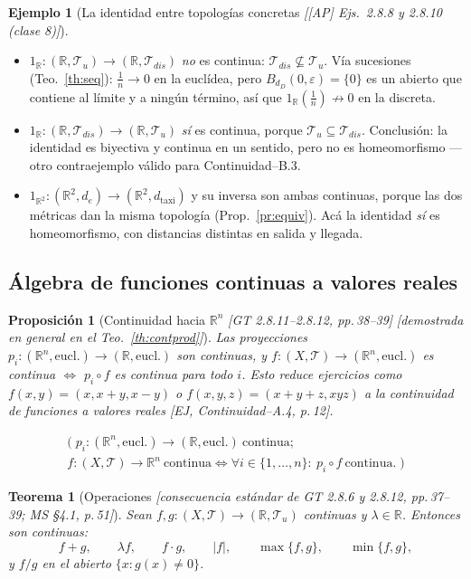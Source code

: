 \documentclass[11pt,a4paper]{article}
\newcommand{\lgc}[1]{\par\vspace{-3pt}\begin{gather*}\big(\;#1\;\big)\end{gather*}\vspace{-6pt}}
\theoremstyle{definition}
\newtheorem{ejemplo}[definicion]{Ejemplo}
\theoremstyle{plain}
\newtheorem{teorema}[definicion]{Teorema}
\newtheorem{proposicion}[definicion]{Proposición}
\newcommand{\fnt}[1]{{\normalfont\small\itshape\color{gray!150!black}[#1]}}
\newcommand{\R}{\mathbb{R}}
\newcommand{\tp}{\mathcal{T}}
\begin{document}
\begin{ejemplo}[La identidad entre topologías concretas \fnt{[AP] Ejs.\ 2.8.8 y 2.8.10 (clase 8)}]\label{ej:iddisc}
\begin{itemize}[leftmargin=1.4em,itemsep=1pt]
\item $1_\R:(\R,\tp_u)\to(\R,\tp_{dis})$ \emph{no} es continua: $\tp_{dis}\not\subseteq\tp_u$. Vía sucesiones (Teo.~\ref{th:seq}): $\tfrac1n\to0$ en la euclídea, pero $B_{d_D}(0,\varepsilon)=\{0\}$ es un abierto que contiene al límite y a ningún término, así que $1_\R(\tfrac1n)\not\to 0$ en la discreta.
\item $1_\R:(\R,\tp_{dis})\to(\R,\tp_u)$ \emph{sí} es continua, porque $\tp_u\subseteq\tp_{dis}$. Conclusión: la identidad es biyectiva y continua en un sentido, pero no es homeomorfismo --- otro contraejemplo válido para Continuidad--B.3.
\item $1_{\R^2}:(\R^2,d_e)\to(\R^2,d_{\text{taxi}})$ y su inversa son ambas continuas, porque las dos métricas dan la misma topología (Prop.~\ref{pr:equiv}). Acá la identidad \emph{sí} es homeomorfismo, con distancias distintas en salida y llegada.
\end{itemize}
\end{ejemplo}

\subsection{Álgebra de funciones continuas a valores reales}\label{sec:alg}

\begin{proposicion}[Continuidad hacia $\R^n$ \fnt{GT 2.8.11--2.8.12, pp.\,38--39} \fnt{demostrada en general en el Teo.~\ref{th:contprod}}]\label{pr:coord}
Las proyecciones $p_i:(\R^n,\text{eucl.})\to(\R,\text{eucl.})$ son continuas, y $f:(X,\tp)\to(\R^n,\text{eucl.})$ es continua $\iff$ $p_i\circ f$ es continua para todo $i$. Esto reduce ejercicios como $f(x,y)=(x,x+y,x-y)$ o $f(x,y,z)=(x+y+z,xyz)$ a la continuidad de funciones a valores reales \fnt{EJ, Continuidad--A.4, p.\,12}.
\lgc{p_i:(\R^n,\text{eucl.})\to(\R,\text{eucl.})\ \text{continua};\\
f:(X,\tp)\to\R^n\ \text{continua}\iff \forall i\in\{1,\dots,n\}:\ p_i\circ f\ \text{continua}.}
\end{proposicion}

\begin{teorema}[Operaciones \fnt{consecuencia estándar de GT 2.8.6 y 2.8.12, pp.\,37--39; MS \S4.1, p.\,51}]
Sean $f,g:(X,\tp)\to(\R,\tp_u)$ continuas y $\lambda\in\R$. Entonces son continuas:
\[
f+g,\qquad \lambda f,\qquad f\cdot g,\qquad |f|,\qquad \max\{f,g\},\qquad \min\{f,g\},
\]
y $f/g$ en el abierto $\{x: g(x)\ne0\}$.
\end{teorema}
\end{document}
